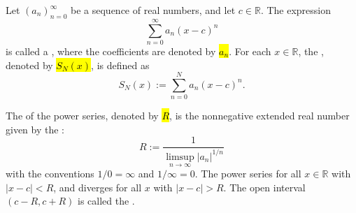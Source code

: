 \begin{definition} \label{definition:real_power_series_centered_at_a_real_number_and_radius_of_convergence_of_a_real_power_series}
    Let $(a_n)_{n=0}^\infty$ be a sequence of real numbers, and let $c \in \mathbb{R}$. The expression
    $$\sum_{n=0}^\infty a_n (x - c)^n$$
    is called a , where the coefficients are denoted by \hl{$a_n$}. For each $x \in \mathbb{R}$, the , denoted by \hl{$S_N(x)$}, is defined as
    $$S_N(x) := \sum_{n=0}^N a_n (x - c)^n.$$

    The  of the power series, denoted by \hl{$R$}, is the nonnegative extended real number given by the :
    $$R := \frac{1}{\limsup_{n \to \infty} |a_n|^{1/n}}$$
    with the conventions $1/0 = \infty$ and $1/\infty = 0$. The power series  for all $x \in \mathbb{R}$ with $|x - c| < R$, and diverges for all $x$ with $|x - c| > R$. The open interval $(c - R, c + R)$ is called the .
\end{definition}
